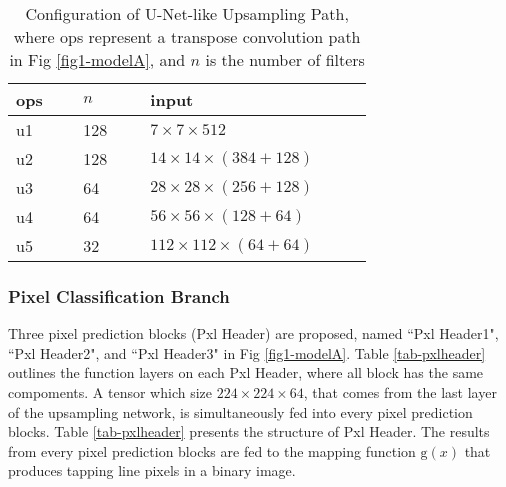 \documentclass[default,pdflatex,iicol]{sn-jnl}%
\begin{document}
\begin{table}[]
\centering
\caption{Configuration of U-Net-like Upsampling Path, where ops represent a transpose convolution path in Fig \ref{fig1-modelA}, and $n$ is the number of filters}
\label{tab-unetpath}
\begin{minipage}{\linewidth}
\begin{center}
\begin{tabular}{p{0.15\linewidth}p{0.15\linewidth}p{0.5\linewidth}}%
ops 	& $n$ 	& \textbf{input}  					\\ \midrule
u1	&128	    & $7 \times 7 \times 512$              	        \\
u2	&128	    & $14 \times 14 \times (384+128)$    	     \\ 
u3	&64	    & $28 \times 28 \times (256+128)$    	       \\
u4	&64	    & $56 \times 56 \times (128+64)$      	        \\
u5	&32	    & $112 \times 112 \times (64+64)$    	        \\ \bottomrule
\end{tabular}%
\end{center}
\end{minipage}
\end{table}

\subsubsection{Pixel Classification Branch}
Three pixel prediction blocks (Pxl Header) are proposed, named ``Pxl Header1", ``Pxl Header2", and ``Pxl Header3" in Fig \ref{fig1-modelA}. Table \ref{tab-pxlheader} outlines the function layers on each Pxl Header, where all block has the same compoments. A tensor which size $224 \times 224 \times 64$, that comes from the last layer of the upsampling network, is simultaneously fed into every pixel prediction blocks. Table \ref{tab-pxlheader} presents the structure of Pxl Header. The results from every pixel prediction blocks are fed to the mapping function $\mathrm{g}(x)$ that produces tapping line pixels in a binary image.
\end{document}
